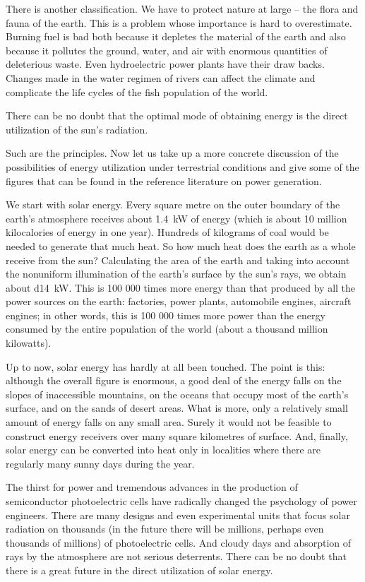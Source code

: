 There is another classification. We have to protect nature at large -- the flora and fauna of the earth. This is a problem whose importance is hard to overestimate. Burning fuel is bad both because it depletes the material of the earth and also because it pollutes the ground, water, and air with enormous quantities of deleterious waste. Even hydroelectric power plants have their draw­ backs. Changes made in the water regimen of rivers can affect the climate and complicate the life cycles of the fish population of the world.

There can be no doubt that the optimal mode of obtaining energy is the direct utilization of the sun's radiation. 

Such are the principles. Now let us take up a more concrete discussion of the possibilities of energy utiliza­tion under terrestrial conditions and give some of the figures that can be found in the reference literature on power generation.

We start with solar energy. Every square metre on the outer boundary of the earth's atmosphere receives about \SI{1.4}{\kilo\watt} of energy (which is about 10 million kilocalories of energy in one year). Hundreds of kilograms of coal would be needed to generate that much heat. So how much heat does the earth as a whole receive from the sun?  Calculating the area of the earth and taking into account the nonuniform illumination of the earth's sur­face by the sun's rays, we obtain about \SI{d14}{\kilo\watt}. This is 100 000 times more energy than that produced by all the power sources on the earth: factories, power plants, automobile engines, aircraft engines; in other words, this is 100 000 times more power than the energy consumed by the entire population of the world (about a thousand million kilowatts).

Up to now, solar energy has hardly at all been touched. The point is this: although the overall figure is enormous, a good deal of the energy falls on the slopes of inacces­sible mountains, on the oceans that occupy most of the earth's surface, and on the sands of desert areas. What is more, only a relatively small amount of energy falls on any small area. Surely it would not be feasible to construct energy receivers over many square kilometres of surface. And, finally, solar energy can be converted into heat only in localities where there are regularly many sunny days during the year.

The thirst for power and tremendous advances in the production of semiconductor photoelectric cells have rad­ically changed the psychology of power engineers. There are many designs and even experimental units that focus solar radiation on thousands (in the future there will be millions, perhaps even thousands of millions) of photoelectric cells. And cloudy days and absorption of rays by the atmosphere are not serious deterrents. There can be no doubt that there is a great future in the direct utiliza­tion of solar energy.


